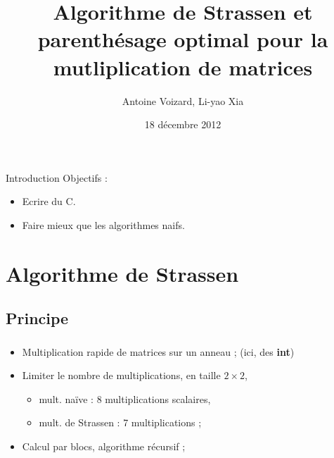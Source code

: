 \documentclass{beamer}
\title[Projet de programmation et d'algorithmique]{
Algorithme de Strassen et parenthésage optimal
pour la mutliplication de matrices}
\author{Antoine Voizard, Li-yao Xia}
\date{18 décembre 2012}
\begin{document}
\begin{frame}
\titlepage
\end{frame}


\begin{frame}{Introduction}
  Objectifs :
  \begin{itemize}
    \item Ecrire du C.
    \item Faire mieux que les algorithmes naifs.
  \end{itemize}
\end{frame}

\section{Algorithme de Strassen}

\subsection{Principe}
\begin{frame}
  \frametitle{\insertsubsection}
  \begin{itemize}
    \item Multiplication rapide de matrices sur un anneau ;
    (ici, des {\bf int})
    \item Limiter le nombre de multiplications, en taille $2 \times 2$,
    \begin{itemize}
      \item mult. naïve : 8 multiplications scalaires,
      \item mult. de Strassen : 7 multiplications ;
    \end{itemize}
    \item Calcul par blocs, algorithme récursif ;
  \end{itemize}
\end{frame}
\end{document}

